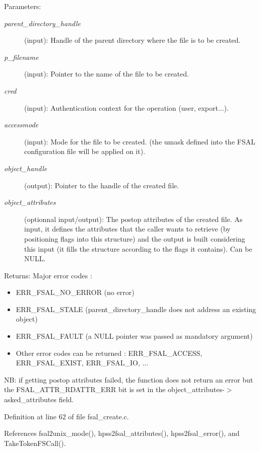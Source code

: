 \begin{Desc}
\item[Parameters:]
\begin{description}
\item[{\em parent\_\-directory\_\-handle}](input): Handle of the parent directory where the file is to be created. \item[{\em p\_\-filename}](input): Pointer to the name of the file to be created. \item[{\em cred}](input): Authentication context for the operation (user, export...). \item[{\em accessmode}](input): Mode for the file to be created. (the umask defined into the FSAL configuration file will be applied on it). \item[{\em object\_\-handle}](output): Pointer to the handle of the created file. \item[{\em object\_\-attributes}](optionnal input/output): The postop attributes of the created file. As input, it defines the attributes that the caller wants to retrieve (by positioning flags into this structure) and the output is built considering this input (it fills the structure according to the flags it contains). Can be NULL.\end{description}
\end{Desc}
\begin{Desc}
\item[Returns:]Major error codes :\begin{itemize}
\item ERR\_\-FSAL\_\-NO\_\-ERROR (no error)\item ERR\_\-FSAL\_\-STALE (parent\_\-directory\_\-handle does not address an existing object)\item ERR\_\-FSAL\_\-FAULT (a NULL pointer was passed as mandatory argument)\item Other error codes can be returned : ERR\_\-FSAL\_\-ACCESS, ERR\_\-FSAL\_\-EXIST, ERR\_\-FSAL\_\-IO, ...\end{itemize}
\end{Desc}
NB: if getting postop attributes failed, the function does not return an error but the FSAL\_\-ATTR\_\-RDATTR\_\-ERR bit is set in the object\_\-attributes-$>$asked\_\-attributes field. 

Definition at line 62 of file fsal\_\-create.c.

References fsal2unix\_\-mode(), hpss2fsal\_\-attributes(), hpss2fsal\_\-error(), and TakeTokenFSCall().
